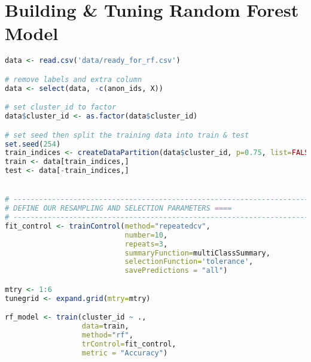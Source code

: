 \newpage
\section{Building \& Tuning Random Forest Model}
\begin{lstlisting}[language=R]
data <- read.csv('data/ready_for_rf.csv')

# remove labels and extra column
data <- select(data, -c(anon_ids, X))

# set cluster_id to factor
data$cluster_id <- as.factor(data$cluster_id)

# set seed then split the training data into train & test
set.seed(254)
train_indices <- createDataPartition(data$cluster_id, p=0.75, list=FALSE)
train <- data[train_indices,]
test <- data[-train_indices,]


# ------------------------------------------------------------------------------
# DEFINE OUR RESAMPLING AND SELECTION PARAMETERS ====
# ------------------------------------------------------------------------------
fit_control <- trainControl(method="repeatedcv",
                            number=10,
                            repeats=3,
                            summaryFunction=multiClassSummary,
                            selectionFunction='tolerance',
                            savePredictions = "all")

mtry <- 1:6
tunegrid <- expand.grid(mtry=mtry)

rf_model <- train(cluster_id ~ .,
                  data=train, 
                  method="rf", 
                  trControl=fit_control,
                  metric = "Accuracy")
\end{lstlisting}